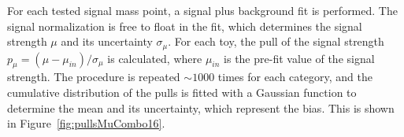 For each tested signal mass point, a signal plus background fit is performed. The signal normalization is free to float in the fit, which determines the signal strength $\mu$ and its uncertainty $\sigma_\mu$. For each toy, the pull of the signal strength $p_\mu = (\mu-\mu_{in})/\sigma_\mu$ is calculated, where $\mu_{in}$ is the pre-fit value of the signal strength. The procedure is repeated $\sim 1000$ times for each category, and the cumulative distribution of the pulls is fitted with a Gaussian function to determine the mean and its uncertainty, which represent the bias. This is shown in Figure~\ref{fig:pullsMuCombo16}.
\begin{figure}[h!]
\centering
{}
\\

\end{figure}
